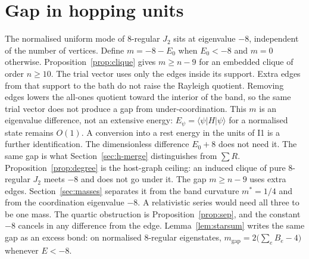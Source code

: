 \section{Gap in hopping units}
\label{sec:h-mass}

The normalised uniform mode of \(8\)-regular \(J_2\) sits at eigenvalue \(-8\),
independent of the number of vertices.
Define \(m=-8-E_0\) when \(E_0<-8\) and \(m=0\) otherwise.
Proposition~\ref{prop:clique} gives \(m\ge n-9\) for an embedded clique of
order \(n\ge 10\).
The trial vector uses only the edges inside its support.
Extra edges from that support to the bath do not raise the Rayleigh quotient.
Removing edges lowers the all-ones quotient toward the interior of the band,
so the same trial vector does not produce a gap from under-coordination.
This \(m\) is an eigenvalue difference, not an extensive energy:
\(E_\psi=\langle\psi|H|\psi\rangle\) for a normalised state remains \(O(1)\).
A conversion into a rest energy in the units of I1 is a further identification.
The dimensionless difference \(E_0+8\) does not need it.
The same gap is what Section~\ref{sec:h-merge} distinguishes from \(\sum R\).
Proposition~\ref{prop:degree} is the host-graph ceiling: an induced clique
of pure \(8\)-regular \(J_2\) meets \(-8\) and does not go under it.
The gap \(m\ge n-9\) uses extra edges.
Section~\ref{sec:masses} separates it from the band curvature \(m^*=1/4\)
and from the coordination eigenvalue \(-8\).
A relativistic series would need all three to be one mass.
The quartic obstruction is Proposition~\ref{prop:sep}, and the constant
\(-8\) cancels in any difference from the edge.
Lemma~\ref{lem:starsum} writes the same gap as an excess bond:
on normalised \(8\)-regular eigenstates,
\(m_{\mathrm{gap}}=2\bigl(\sum_e B_e-4\bigr)\) whenever \(E<-8\).
